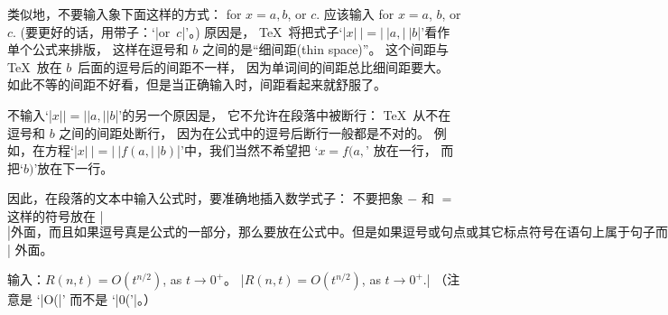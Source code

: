 类似地，不要输入象下面这样的方式：
\begintt
for $x = a, b$, or $c$.
\endtt
应该输入
\begintt
for $x = a$, $b$, or $c$.
\endtt
(要更好的话，用带子：`|or~$c$|'。)
原因是， \TeX\ 将把式子`|$x|~|=|~|a,|~|b$|'看作单个公式来排版，
这样在逗号和 $b$ 之间的是``细间距(thin space)''。%
这个间距与 \TeX\ 放在 $b$~{后面}的逗号后的间距不一样，
因为单词间的间距总比细间距要大。%
如此不等的间距不好看，但是当正确输入时，间距看起来就舒服了。

不输入`|$x| |=| |a,| |b$|'的另一个原因是，
它不允许在段落中被断行：
 \TeX\ 从不在逗号和 $b$ 之间的间距处断行，
因为在公式中的逗号后断行一般都是不对的。%
例如，在方程`|$x|~|=|~|f(a,|~|b)$|'中，我们当然不希望把 `$x=f(a,$' 放在一行，
而把`$b)$'放在下一行。

因此，在段落的文本中输入公式时，要准确地插入数学式子：
不要把象 $-$ 和 $=$ 这样的符号放在 |$| 外面，
而且如果逗号真是公式的一部分，那么要放在公式中。%
但是如果逗号或句点或其它标点符号在语句上属于句子而不是公式，
要把它放在 |$| 外面。

\exercise 输入：$R(n,t)=O(t^{n/2})$, as $t\to0^+$。
\answer \1|$R(n,t)=O(t^{n/2})$, as $t\to0^+$.|%
（注意是 `|O(|' 而不是 `|0('|。）

